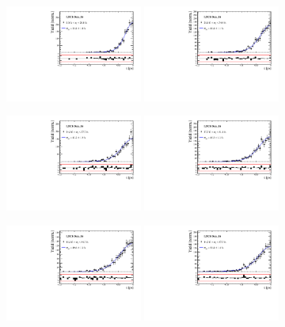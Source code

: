 \begin{figure}[h]
\centering
\includegraphics[height=!,width=0.4\textwidth]{figs/Resolution/SignalData_16_bin_1.pdf}
\includegraphics[height=!,width=0.4\textwidth]{figs/Resolution/SignalData_16_bin_2.pdf}

\includegraphics[height=!,width=0.4\textwidth]{figs/Resolution/SignalData_16_bin_3.pdf}
\includegraphics[height=!,width=0.4\textwidth]{figs/Resolution/SignalData_16_bin_4.pdf}

\includegraphics[height=!,width=0.4\textwidth]{figs/Resolution/SignalData_16_bin_5.pdf}
\includegraphics[height=!,width=0.4\textwidth]{figs/Resolution/SignalData_16_bin_6.pdf}


\end{figure}
